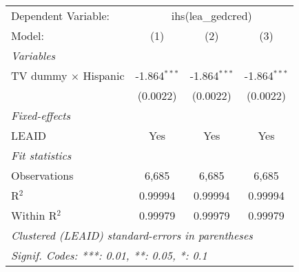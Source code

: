 \begin{tabular}{lccc}
\tabularnewline\midrule\midrule
Dependent Variable:&\multicolumn{3}{c}{ihs(lea\_gedcred)}\\
Model:&(1) & (2) & (3)\\
\midrule \emph{Variables}&   &   &  \\
TV dummy $\times$ Hispanic & -1.864$^{***}$ & -1.864$^{***}$ & -1.864$^{***}$\\
  &(0.0022) & (0.0022) & (0.0022)\\
\midrule \emph{Fixed-effects}&   &   &  \\
LEAID & Yes & Yes & Yes\\
\midrule \emph{Fit statistics}&  & & \\
Observations & 6,685&6,685&6,685\\
R$^2$ & 0.99994&0.99994&0.99994\\
Within R$^2$ & 0.99979&0.99979&0.99979\\
\midrule\midrule\multicolumn{4}{l}{\emph{Clustered (LEAID) standard-errors in parentheses}}\\
\multicolumn{4}{l}{\emph{Signif. Codes: ***: 0.01, **: 0.05, *: 0.1}}\\
\end{tabular}


